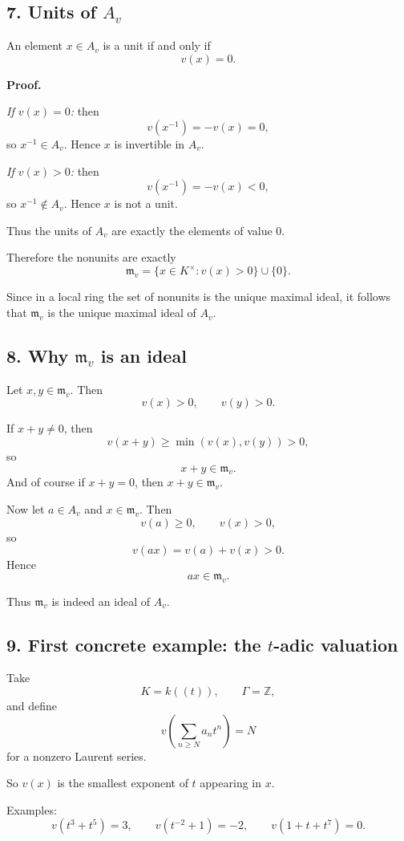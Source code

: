 \documentclass[12pt,a4paper]{article}
\theoremstyle{notespace}
\begin{document}
\subsection{7. Units of \(A_v\)}

An element \(x\in A_v\) is a unit if and only if
\[
v(x)=0.
\]

\textbf{Proof.}

\emph{If \(v(x)=0\):} then
\[
v(x^{-1})=-v(x)=0,
\]
so \(x^{-1}\in A_v\). Hence \(x\) is invertible in \(A_v\).

\emph{If \(v(x)>0\):} then
\[
v(x^{-1})=-v(x)<0,
\]
so \(x^{-1}\notin A_v\). Hence \(x\) is not a unit.

Thus the units of \(A_v\) are exactly the elements of value \(0\).

Therefore the nonunits are exactly
\[
\mathfrak m_v=\{x\in K^\times : v(x)>0\}\cup\{0\}.
\]

Since in a local ring the set of nonunits is the unique maximal ideal, it follows that \(\mathfrak m_v\) is the unique maximal ideal of \(A_v\).

\subsection{8. Why \(\mathfrak m_v\) is an ideal}

Let \(x,y\in \mathfrak m_v\). Then
\[
v(x)>0,
\qquad
v(y)>0.
\]

If \(x+y\neq 0\), then
\[
v(x+y)\ge \min(v(x),v(y))>0,
\]
so
\[
x+y\in \mathfrak m_v.
\]
And of course if \(x+y=0\), then \(x+y\in \mathfrak m_v\).

Now let \(a\in A_v\) and \(x\in \mathfrak m_v\). Then
\[
v(a)\ge 0,
\qquad
v(x)>0,
\]
so
\[
v(ax)=v(a)+v(x)>0.
\]
Hence
\[
ax\in \mathfrak m_v.
\]

Thus \(\mathfrak m_v\) is indeed an ideal of \(A_v\).

\subsection{9. First concrete example: the \(t\)-adic valuation}

Take
\[
K=k((t)),
\qquad
\Gamma=\mathbb Z,
\]
and define
\[
v\!\left(\sum_{n\ge N} a_n t^n\right)=N
\]
for a nonzero Laurent series.

So \(v(x)\) is the smallest exponent of \(t\) appearing in \(x\).

Examples:
\[
v(t^3+t^5)=3,
\qquad
v(t^{-2}+1)=-2,
\qquad
v(1+t+t^7)=0.
\]
\end{document}

